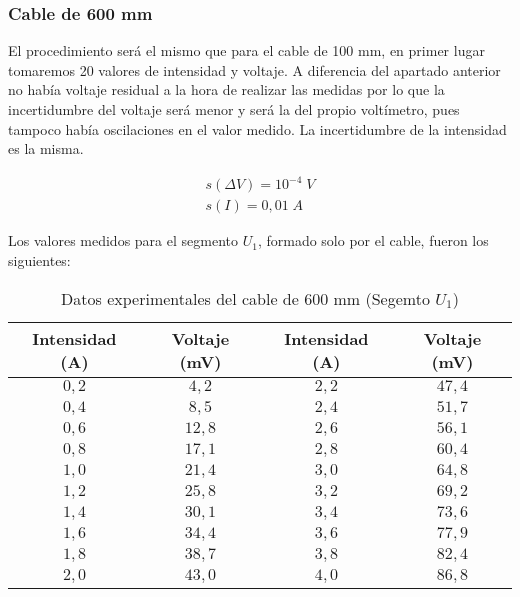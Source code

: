 \documentclass[a4paper,12pt,titlepage]{article}
\begin{document}
\newpage

\subsubsection{Cable de 600 mm}

El procedimiento será el mismo que para el cable de 100 mm, en primer lugar tomaremos 20 valores de intensidad y voltaje. A diferencia del apartado anterior no había voltaje residual a la hora de realizar las medidas por lo que la incertidumbre del voltaje será menor y será la del propio voltímetro, pues tampoco había oscilaciones en el valor medido. La incertidumbre de la intensidad es la misma.

\begin{equation}
    \begin{gathered}
        s(\Delta V) = 10^{-4} \; V \\
        s(I) = 0,01\; A
    \end{gathered}
\end{equation}

Los valores medidos para el segmento $U_{1}$, formado solo por el cable, fueron los siguientes:

\begin{table}[h!]
    \centering
    \begin{tabular}{|c|c|c|c|}
        \hline
        Intensidad (A) & Voltaje (mV) & Intensidad (A) & Voltaje (mV) \\
        \hline
        $0,2$ & $4,2$ & $2,2$ & $47,4$ \\
        \hline
        $0,4$ & $8,5$ & $2,4$ & $51,7$ \\
        \hline
        $0,6$ & $12,8$ & $2,6$ & $56,1$ \\
        \hline
        $0,8$ & $17,1$ & $2,8$ & $60,4$ \\
        \hline
        $1,0$ & $21,4$ & $3,0$ & $64,8$ \\
        \hline
        $1,2$ & $25,8$ & $3,2$ & $69,2$ \\
        \hline
        $1,4$ & $30,1$ & $3,4$ & $73,6$ \\
        \hline
        $1,6$ & $34,4$ & $3,6$ & $77,9$ \\
        \hline
        $1,8$ & $38,7$ & $3,8$ & $82,4$ \\
        \hline
        $2,0$ & $43,0$ & $4,0$ & $86,8$ \\
        \hline
    \end{tabular}
    \caption{Datos experimentales del cable de 600 mm (Segemto $U_{1}$)}
\end{table}
\end{document}
